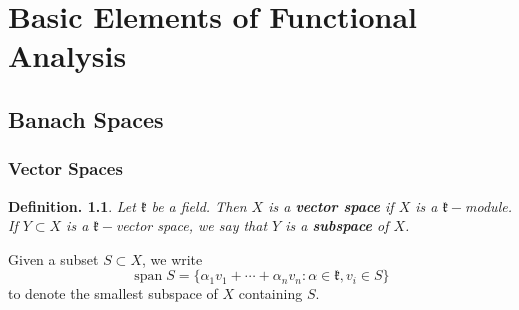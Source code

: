 \documentclass[11pt, a4paper]{memoir}
\theoremstyle{change}
\theoremstyle{plain}
\theoremstyle{nonumberplain}
\newtheorem{definition}{Definition.}
\DeclareMathOperator{\spn}{span}
\numberwithin{equation}{section}
\begin{document}
\chapter{Basic Elements of Functional Analysis}
\section{Banach Spaces}
\subsection{Vector Spaces}
\begin{definition}
    Let $\mathfrak{k}$ be a field.
    Then $X$ is a \textbf{vector space} if $X$ is a $\mathfrak{k}-$module.
    If $Y\subset X$ is a $\mathfrak{k}-$vector space, we say that $Y$ is a \textbf{subspace} of $X$.
\end{definition}
Given a subset $S\subset X$, we write
\begin{equation*}
    \spn S=\{\alpha_1v_1+\cdots+\alpha_nv_n:\alpha\in\mathfrak{k},v_i\in S\}
\end{equation*}
to denote the smallest subspace of $X$ containing $S$.
\end{document}
